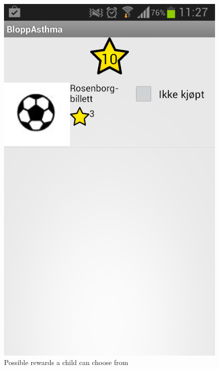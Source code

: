 \begin{figure}
\begin{minipage}[t]{0.3\linewidth}
			\includegraphics[width=0.20\paperwidth]{Pictures/new-screenshots/child-possible-rewards.png}
		\caption{Possible rewards a child can choose from}
		\label{fig:child-possible-rewards}
	\end{minipage}
	\hspace{0.5cm}
	\begin{minipage}[t]{0.3\linewidth}
		\centering

\end{minipage}
\end{figure}
